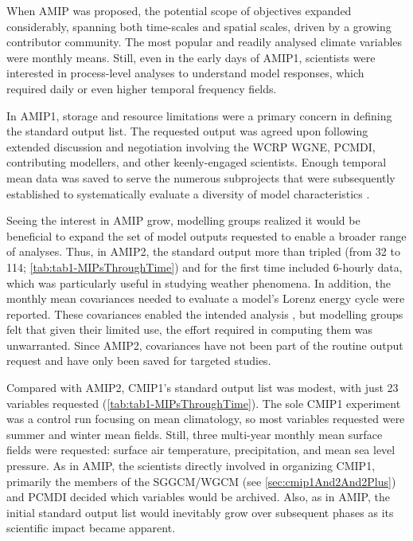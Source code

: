 \documentclass[gmd, preprint]{copernicus}
\begin{document}
When AMIP was proposed, the potential scope of objectives expanded considerably, spanning both time-scales and spatial scales, driven by a growing contributor community. The most popular and readily analysed climate variables were monthly means. Still, even in the early days of AMIP1, scientists were interested in process-level analyses to understand model responses, which required daily or even higher temporal frequency fields.

In AMIP1, storage and resource limitations were a primary concern in defining the standard output list. The requested output was agreed upon following extended discussion and negotiation involving the WCRP WGNE, PCMDI, contributing modellers, and other keenly-engaged scientists. Enough temporal mean data was saved to serve the numerous subprojects that were subsequently established to systematically evaluate a diversity of model characteristics \citep{gates_amip_1995}. 

Seeing the interest in AMIP grow, modelling groups realized it would be beneficial to expand the set of model outputs requested to enable a broader range of analyses. Thus, in AMIP2, the standard output more than tripled (from 32 to 114; \autoref{tab:tab1-MIPsThroughTime}) and for the first time included 6-hourly data, which was particularly useful in studying weather phenomena. In addition, the monthly mean covariances needed to evaluate a model's Lorenz energy cycle were reported. These covariances enabled the intended analysis \citep{boer_energy_2008}, but modelling groups felt that given their limited use, the effort required in computing them was unwarranted. Since AMIP2, covariances have not been part of the routine output request and have only been saved for targeted studies.

Compared with AMIP2, CMIP1's standard output list was modest, with just 23 variables requested (\autoref{tab:tab1-MIPsThroughTime}). The sole CMIP1 experiment was a control run focusing on mean climatology, so most variables requested were summer and winter mean fields. Still, three multi-year monthly mean surface fields were requested: surface air temperature, precipitation, and mean sea level pressure. As in AMIP, the scientists directly involved in organizing CMIP1, primarily the members of the SGGCM/WGCM (see \autoref{sec:cmip1And2And2Plus}) and PCMDI decided which variables would be archived. Also, as in AMIP, the initial standard output list would inevitably grow over subsequent phases as its scientific impact became apparent.
\end{document}
